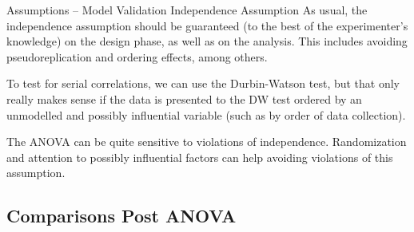 \begin{frame}[fragile]
{Assumptions -- Model Validation}
{Independence Assumption}
As usual, the independence assumption should be guaranteed (to the best of the experimenter's knowledge) on the design phase, as well as on the analysis. This includes avoiding pseudoreplication and ordering effects, among others.
\bigskip

To test for serial correlations, we can use the Durbin-Watson test, but that only really makes sense if the data is presented to the DW test ordered by an unmodelled and possibly influential variable (such as by order of data collection).\bigskip
%

The ANOVA can be quite sensitive to violations of independence. Randomization and attention to possibly influential factors can help avoiding violations of this assumption.
\end{frame}
%
%

\subsection{Comparisons Post ANOVA}

